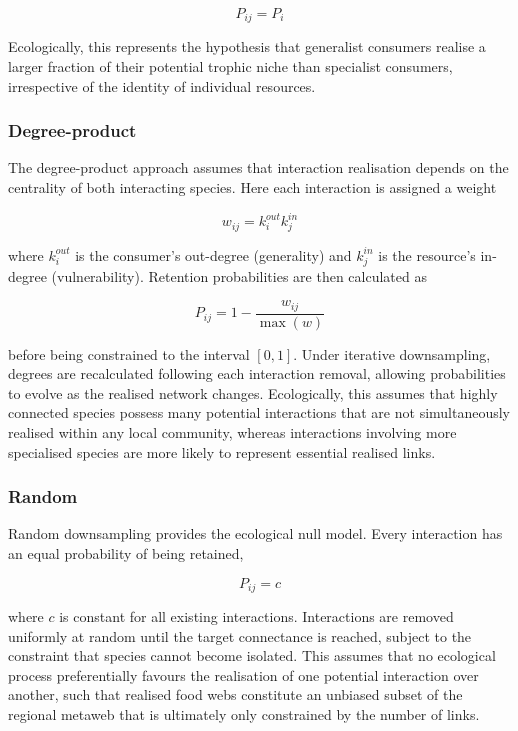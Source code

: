 \documentclass[
]{article}
\begin{document}
\[
P_{ij}=P_i
\]

Ecologically, this represents the hypothesis that generalist consumers
realise a larger fraction of their potential trophic niche than
specialist consumers, irrespective of the identity of individual
resources.

\subsubsection{Degree-product}\label{degree-product}

The degree-product approach assumes that interaction realisation depends
on the centrality of both interacting species. Here each interaction is
assigned a weight

\[
w_{ij}=k_i^{out}k_j^{in}
\]

where \(k_i^{out}\) is the consumer's out-degree (generality) and
\(k_j^{in}\) is the resource's in-degree (vulnerability). Retention
probabilities are then calculated as

\[
P_{ij} = 1- \frac{w_{ij}}{\max(w)}
\]

before being constrained to the interval \([0,1]\). Under iterative
downsampling, degrees are recalculated following each interaction
removal, allowing probabilities to evolve as the realised network
changes. Ecologically, this assumes that highly connected species
possess many potential interactions that are not simultaneously realised
within any local community, whereas interactions involving more
specialised species are more likely to represent essential realised
links.

\subsubsection{Random}\label{random}

Random downsampling provides the ecological null model. Every
interaction has an equal probability of being retained,

\[
P_{ij}=c
\]

where \(c\) is constant for all existing interactions. Interactions are
removed uniformly at random until the target connectance is reached,
subject to the constraint that species cannot become isolated. This
assumes that no ecological process preferentially favours the
realisation of one potential interaction over another, such that
realised food webs constitute an unbiased subset of the regional metaweb
that is ultimately only constrained by the number of links.
\end{document}
